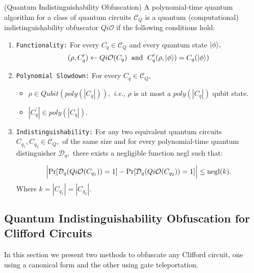 \begin{definition}\label{def:QiO} {\rm (Quantum Indistinguishability Obfuscation)}
A  polynomial-time quantum algorithm for a class of quantum circuits $\mathcal{C}_Q$ is a quantum {\rm(}computational{\rm)} indistinguishability obfuscator $Qi\mathcal{O}$  if the following conditions hold:

\begin{enumerate}
\item {\tt Functionality:}  For every $C_q\in \mathcal{C}_Q$ and every quantum state ${\lvert}\phi\rangle,$
$$(\rho, C_q^\prime)\leftarrow Qi\mathcal{O}(C_q) \;  \mbox{ and }\; C_q^\prime(\rho,{\lvert}\phi\rangle)=C_{q}({\lvert}\phi\rangle)$$
											

\item  {\tt Polynomial Slowdown:}  For every $C_{q}\in \mathcal{C}_Q,$
\begin{itemize}
\item  $\rho \in \mathit{Qubit}(poly(|C_{q}|)),$ \emph{i.e.}, $\rho$ is at most a $poly(|C_{q}|)$ qubit state.
\item $|C_{q}^\prime| \in poly(|C_{q}|).$
\end{itemize}

\item {\tt Indistinguishability:} For any two equivalent quantum circuits $C_{q_1},C_{q_2}\in \mathcal{C}_Q,$ of the same size
 and for every polynomial-time quantum distinguisher $\mathcal{D}_q,$ there exists a negligible function {\rm negl} such that:

	
					$$\Big |{\rm Pr}[\mathcal{D}_q(Qi\mathcal{O}(C_{q_1}))=1]-{\rm Pr}[\mathcal{D}_q(Qi\mathcal{O}(C_{q_2}))=1] \Big |\leq  {\rm negl}(k).$$		
Where $k=|C_{q_1}|=|C_{q_2}|.$						
\end{enumerate}

\end{definition}


\subsection{Quantum Indistinguishability Obfuscation for Clifford Circuits}
 In this section we present two methods to obfuscate any Clifford circuit,  one using a canonical form and the other using gate teleportation.

